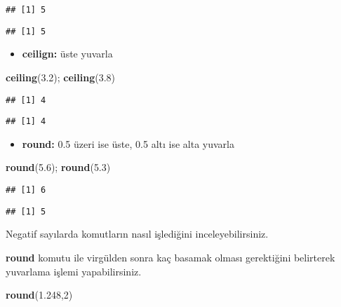 \documentclass[
]{book}
\newenvironment{Shaded}{\begin{snugshade}}{\end{snugshade}}
\newcommand{\DecValTok}[1]{\textcolor[rgb]{0.00,0.00,0.81}{#1}}
\newcommand{\FloatTok}[1]{\textcolor[rgb]{0.00,0.00,0.81}{#1}}
\newcommand{\KeywordTok}[1]{\textcolor[rgb]{0.13,0.29,0.53}{\textbf{#1}}}
\newcommand{\NormalTok}[1]{#1}
\providecommand{\tightlist}{%
  \setlength{\itemsep}{0pt}\setlength{\parskip}{0pt}}
\begin{document}
\begin{verbatim}
## [1] 5
\end{verbatim}

\begin{verbatim}
## [1] 5
\end{verbatim}

\begin{itemize}
\tightlist
\item
  \textbf{ceilign:} üste yuvarla
\end{itemize}

\begin{Shaded}
\begin{Highlighting}[]
\KeywordTok{ceiling}\NormalTok{(}\FloatTok{3.2}\NormalTok{); }\KeywordTok{ceiling}\NormalTok{(}\FloatTok{3.8}\NormalTok{)}
\end{Highlighting}
\end{Shaded}

\begin{verbatim}
## [1] 4
\end{verbatim}

\begin{verbatim}
## [1] 4
\end{verbatim}

\begin{itemize}
\tightlist
\item
  \textbf{round:} 0.5 üzeri ise üste, 0.5 altı ise alta yuvarla
\end{itemize}

\begin{Shaded}
\begin{Highlighting}[]
\KeywordTok{round}\NormalTok{(}\FloatTok{5.6}\NormalTok{); }\KeywordTok{round}\NormalTok{(}\FloatTok{5.3}\NormalTok{)}
\end{Highlighting}
\end{Shaded}

\begin{verbatim}
## [1] 6
\end{verbatim}

\begin{verbatim}
## [1] 5
\end{verbatim}

{Negatif sayılarda komutların nasıl işlediğini inceleyebilirsiniz. }

\textbf{round} komutu ile virgülden sonra kaç basamak olması gerektiğini belirterek yuvarlama işlemi yapabilirsiniz.

\begin{Shaded}
\begin{Highlighting}[]
\KeywordTok{round}\NormalTok{(}\FloatTok{1.248}\NormalTok{,}\DecValTok{2}\NormalTok{)}
\end{Highlighting}
\end{Shaded}
\end{document}
